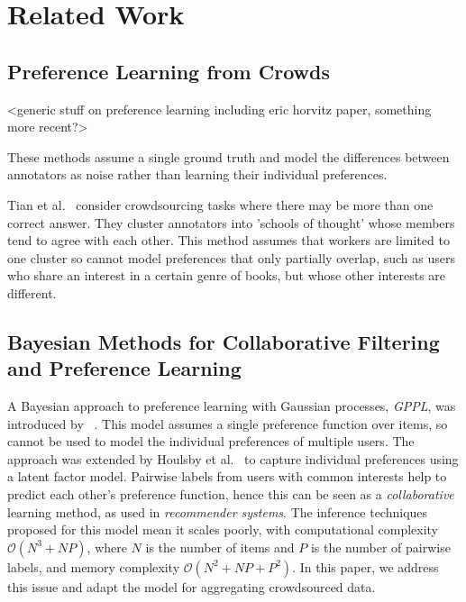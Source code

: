\section{Related Work}
\label{sec:rw}


\subsection{Preference Learning from Crowds}

<generic stuff on preference learning including eric horvitz paper, something more recent?>

These methods assume a single ground truth and model the differences between annotators as noise rather than
learning their individual preferences.

Tian et al.~\cite{tian2012learning} 
consider crowdsourcing tasks where there may be more than one correct answer. 
They cluster annotators into 'schools of thought' whose members tend to agree with each other. 
This method assumes that workers are limited to one cluster so cannot model preferences that 
only partially overlap, such as users who share an interest in a certain genre of books, 
but whose other interests are different.

\subsection{Bayesian Methods for Collaborative Filtering and Preference Learning}

A Bayesian approach to preference learning with Gaussian processes, \emph{GPPL}, was introduced by ~\citet{chu2005preference}. This model assumes a single preference function over items, so cannot
be used to model the individual preferences of multiple users.
The approach was extended by Houlsby et al.~\citeyear{houlsby2012collaborative}
to capture individual preferences using a latent factor model. 
Pairwise labels from users with common interests help to predict each other's preference function, hence 
this can be seen as a \emph{collaborative} learning method, as used in \emph{recommender systems}.
The inference techniques proposed for this model mean it scales poorly, with computational complexity $\mathcal{O}(N^3 + NP)$, where $N$ is the number of items and $P$ is the number of pairwise labels, and memory complexity $\mathcal{O}(N^2 + NP + P^2)$. In this paper, we address this issue and adapt the model for aggregating crowdsourced data.


